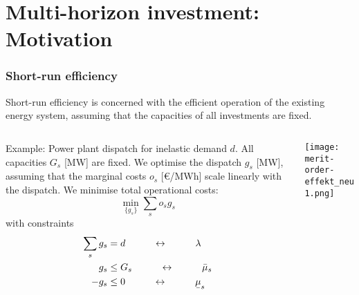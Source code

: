 \documentclass[10pt,aspectratio=169,dvipsnames]{beamer}
\def\l{\lambda}
\def\m{\mu}
\newcommand{\ubar}[1]{\text{\b{$#1$}}}
\begin{document}
\section{Multi-horizon investment: Motivation}


\begin{frame}
  \frametitle{Short-run efficiency}

  Short-run efficiency is concerned with the \alert{efficient operation} of the existing energy system, assuming that the capacities of all investments are fixed.
  \begin{columns}[T]
    \begin{column}{7.5cm}

      \alert{Example}: Power plant dispatch for inelastic demand $d$. All capacities $G_s$ [MW] are fixed. We optimise the \alert{dispatch} $g_s$ [MW], assuming that the \alert{marginal costs} $o_s$ [\euro/MWh] scale linearly with the dispatch. We minimise \alert{total operational costs}:
      \begin{equation*}
        \min_{\{g_s\}} \sum_s o_s g_s
      \end{equation*}
      with constraints
  \begin{align*}
    \sum_s g_s & = d\hspace{1cm} \leftrightarrow \hspace{1cm} \l \\
        g_s  & \leq  G_s  \hspace{1cm}\leftrightarrow\hspace{1cm} \bar{\m}_s \\
    - g_s  & \leq  0  \hspace{1cm}\leftrightarrow\hspace{1cm} \ubar{\m}_s
  \end{align*}
    \end{column}
    \begin{column}{6.5cm}

        \vspace{.5cm}
        \texttt{[image: merit-order-effekt\_neu1.png]}


    \end{column}
  \end{columns}

\end{frame}
\end{document}
